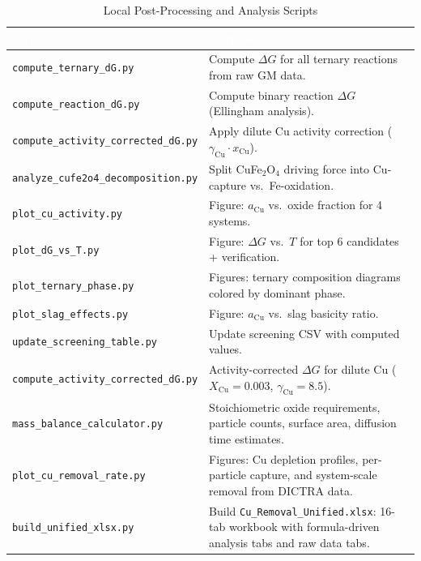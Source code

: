\documentclass[11pt]{article}
\begin{document}
\begin{table}[H]
\caption{Local Post-Processing and Analysis Scripts}
\label{tab:local_scripts}
\centering
\renewcommand{\arraystretch}{1.15}
\footnotesize
\begin{tabular}{|p{2.8in}|p{3.2in}|}
\hline
\rowcolor{headercolor}
\textcolor{white}{\textbf{Script}} & \textcolor{white}{\textbf{Purpose}} \\
\hline
\texttt{compute\_ternary\_dG.py} & Compute $\Delta G$ for all ternary reactions from raw GM data. \\
\hline
\rowcolor{altrow}
\texttt{compute\_reaction\_dG.py} & Compute binary reaction $\Delta G$ (Ellingham analysis). \\
\hline
\texttt{compute\_activity\_corrected\_dG.py} & Apply dilute Cu activity correction ($\gamma_{\text{Cu}} \cdot x_{\text{Cu}}$). \\
\hline
\rowcolor{altrow}
\texttt{analyze\_cufe2o4\_decomposition.py} & Split CuFe$_2$O$_4$ driving force into Cu-capture vs.\ Fe-oxidation. \\
\hline
\texttt{plot\_cu\_activity.py} & Figure: $a_{\text{Cu}}$ vs.\ oxide fraction for 4 systems. \\
\hline
\rowcolor{altrow}
\texttt{plot\_dG\_vs\_T.py} & Figure: $\Delta G$ vs.\ $T$ for top 6 candidates + verification. \\
\hline
\texttt{plot\_ternary\_phase.py} & Figures: ternary composition diagrams colored by dominant phase. \\
\hline
\rowcolor{altrow}
\texttt{plot\_slag\_effects.py} & Figure: $a_{\text{Cu}}$ vs.\ slag basicity ratio. \\
\hline
\texttt{update\_screening\_table.py} & Update screening CSV with computed values. \\
\hline
\rowcolor{altrow}
\texttt{compute\_activity\_corrected\_dG.py} & Activity-corrected $\Delta G$ for dilute Cu ($X_{\text{Cu}}=0.003$, $\gamma_{\text{Cu}}=8.5$). \\
\hline
\rowcolor{altrow}
\texttt{mass\_balance\_calculator.py} & Stoichiometric oxide requirements, particle counts, surface area, diffusion time estimates. \\
\hline
\texttt{plot\_cu\_removal\_rate.py} & Figures: Cu depletion profiles, per-particle capture, and system-scale removal from DICTRA data. \\
\hline
\rowcolor{altrow}
\texttt{build\_unified\_xlsx.py} & Build \texttt{Cu\_Removal\_Unified.xlsx}: 16-tab workbook with formula-driven analysis tabs and raw data tabs. \\
\hline
\end{tabular}
\end{table}
\end{document}
